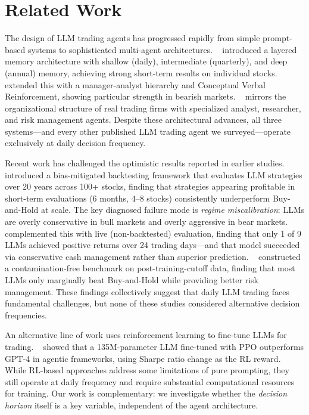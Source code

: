 \section{Related Work}
\label{sec:related_work}

The design of LLM trading agents has progressed rapidly from simple prompt-based systems to sophisticated multi-agent architectures. \finmem~\citep{yu2023finmem} introduced a layered memory architecture with shallow (daily), intermediate (quarterly), and deep (annual) memory, achieving strong short-term results on individual stocks. \fincon~\citep{yu2024fincon} extended this with a manager-analyst hierarchy and Conceptual Verbal Reinforcement, showing particular strength in bearish markets. \tradingagents~\citep{xiao2025tradingagents} mirrors the organizational structure of real trading firms with specialized analyst, researcher, and risk management agents. Despite these architectural advances, all three systems---and every other published LLM trading agent we surveyed---operate exclusively at daily decision frequency.

Recent work has challenged the optimistic results reported in earlier studies. \finsaber~\citep{li2026finsaber} introduced a bias-mitigated backtesting framework that evaluates LLM strategies over 20 years across 100+ stocks, finding that strategies appearing profitable in short-term evaluations (6 months, 4--8 stocks) consistently underperform Buy-and-Hold at scale. The key diagnosed failure mode is \emph{regime miscalibration}: LLMs are overly conservative in bull markets and overly aggressive in bear markets. \deepfund~\citep{deepfund2025} complemented this with live (non-backtested) evaluation, finding that only 1 of 9 LLMs achieved positive returns over 24 trading days---and that model succeeded via conservative cash management rather than superior prediction. \stockbench~\citep{chen2025stockbench} constructed a contamination-free benchmark on post-training-cutoff data, finding that most LLMs only marginally beat Buy-and-Hold while providing better risk management. These findings collectively suggest that daily LLM trading faces fundamental challenges, but none of these studies considered alternative decision frequencies.

An alternative line of work uses reinforcement learning to fine-tune LLMs for trading. \flagtrader~\citep{li2025flagtrader} showed that a 135M-parameter LLM fine-tuned with PPO outperforms GPT-4 in agentic frameworks, using Sharpe ratio change as the RL reward. While RL-based approaches address some limitations of pure prompting, they still operate at daily frequency and require substantial computational resources for training. Our work is complementary: we investigate whether the \emph{decision horizon} itself is a key variable, independent of the agent architecture.


